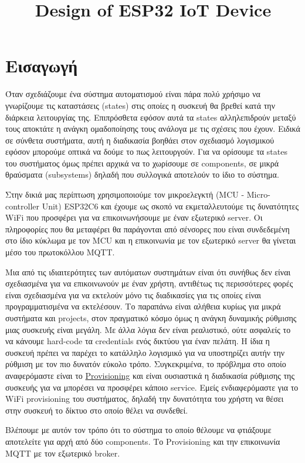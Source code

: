 \documentclass[a4paper,12pt]{article}
\title{Design of ESP32 IoT Device}
\begin{document}
\section{Εισαγωγή}

Όταν σχεδιάζουμε ένα σύστημα αυτοματισμού είναι πάρα πολύ χρήσιμο να γνωρίζουμε τις
καταστάσεις (states) στις οποίες η συσκευή θα βρεθεί κατά την διάρκεια λειτουργίας της.
Επιπρόσθετα εφόσον αυτά τα states αλληλεπιδρούν μεταξύ τους αποκτάτε η ανάγκη ομαδοποίησης τους
ανάλογα με τις σχέσεις που έχουν. Ειδικά σε σύνθετα συστήματα, αυτή η διαδικασία βοηθάει
στον σχεδιασμό λογισμικού εφόσον μπορούμε οπτικά να δούμε το πως λειτουργούν. Για να ορίσουμε τα states του συστήματος
όμως πρέπει αρχικά να το χωρίσουμε σε components, σε μικρά θραύσματα (subsystems) δηλαδή που συλλογικά αποτελούν
το ίδιο το σύστημα.

Στην δικιά μας περίπτωση χρησιμοποιούμε τον μικροελεγκτή (MCU - Micro-controller Unit) ESP32C6 και έχουμε ως σκοπό να εκμεταλλευτούμε
τις δυνατότητες WiFi που προσφέρει για να επικοινωνήσουμε με έναν εξωτερικό server. Οι πληροφορίες που θα
μεταφέρει θα παράγονται από σένσορες που είναι συνδεδεμένη στο ίδιο κύκλωμα με τον MCU και η επικοινωνία με τον εξωτερικό
server θα γίνεται μέσο του πρωτοκόλλου MQTT.

Μια από τις ιδιαιτερότητες των αυτόματων συστημάτων είναι ότι συνήθως δεν είναι σχεδιασμένα για να επικοινωνούν με έναν
χρήστη, αντιθέτως τις περισσότερες φορές είναι σχεδιασμένα για να εκτελούν μόνο τις διαδικασίες για τις οποίες είναι
προγραμματισμένα να εκτελέσουν. Το παραπάνω είναι αλήθεια κυρίως για μικρά συστήματα και projects, στον πραγματικό κόσμο
όμως η ανάγκη δυναμικής ρύθμισης μιας συσκευής είναι μεγάλη. Με άλλα λόγια δεν είναι ρεαλιστικό, ούτε ασφαλείς το να κάνουμε hard-code
τα credentials ενός δικτύου για έναν πελάτη. Η ίδια η συσκευή πρέπει να παρέχει το κατάλληλο λογισμικό για να υποστηρίζει αυτήν την
ρύθμιση με τον πιο δυνατόν εύκολο τρόπο. Συγκεκριμένα, το πρόβλημα στο οποίο αναφερόμαστε είναι το
\href{https://en.wikipedia.org/wiki/Provisioning_(technology)}{Provisioning}
και είναι ουσιαστικά η διαδικασία ρύθμισης της συσκευής για να μπορέσει να προσφέρει κάποιο service. Εμείς ενδιαφερόμαστε για το
WiFi provisioning του συστήματος, δηλαδή την δυνατότητα του χρήστη να θέσει στην συσκευή το δίκτυο στο οποίο θέλει να συνδεθεί.

Βλέπουμε με αυτόν τον τρόπο ότι το σύστημα το οποίο θέλουμε να φτιάξουμε αποτελείτε για αρχή από δύο components. Το Provisioning
και την επικοινωνία MQTT με τον εξωτερικό broker.
\end{document}
